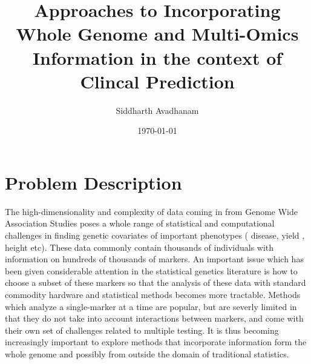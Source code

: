 \documentclass{sig-alternate-05-2015}
\begin{document}

\title{Approaches to Incorporating Whole Genome and Multi-Omics Information in the context of Clincal Prediction}

\author{
%
%
Siddharth Avadhanam\\
}
\date{\today}

\maketitle



\section{Problem Description}

The high-dimensionality and complexity of data coming in from Genome Wide Association Studies
poses a whole range of statistical and computational challenges in finding genetic covariates of important phenotypes
( disease, yield , height etc). These data commonly contain thousands of individuals with information on
hundreds of thousands of markers. \cite{zhang_chapter_2012} An important issue which has been given considerable attention in the statistical genetics
literature is how to choose a subset of these markers so that the analysis of these data with standard commodity hardware and statistical methods
becomes more tractable.\cite{de_los_campos_whole-genome_2013} Methods which analyze a single-marker at a time are popular, but are severly limited in that they do not take into account
interactions between markers, and come with their own set of challenges related to multiple testing.\cite{moskvina_multiple-testing_2008}
It is thus becoming increasingly important to explore methods that incorporate information form the whole genome and possibly from outside the domain of traditional statistics.
\end{document}

